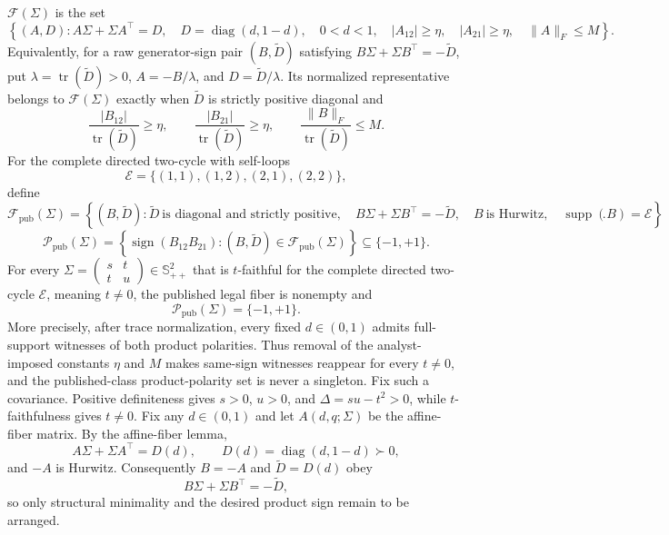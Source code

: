 \(\mathcal F(\Sigma)\) is the set
\[
\left\{(A,D):A\Sigma+\Sigma A^{\top}=D,\quad D=\operatorname{diag}(d,1-d),\quad 0<d<1,\quad |A_{12}|\ge\eta,\quad |A_{21}|\ge\eta,\quad \lVert A\rVert_F\le M\right\}.
\]
Equivalently, for a raw generator-sign pair \((B,\widetilde D)\) satisfying \(B\Sigma+\Sigma B^{\top}=-\widetilde D\), put \(\lambda=\operatorname{tr}(\widetilde D)>0\), \(A=-B/\lambda\), and \(D=\widetilde D/\lambda\). Its normalized representative belongs to \(\mathcal F(\Sigma)\) exactly when \(\widetilde D\) is strictly positive diagonal and
\[
\frac{|B_{12}|}{\operatorname{tr}(\widetilde D)}\ge\eta,\qquad
\frac{|B_{21}|}{\operatorname{tr}(\widetilde D)}\ge\eta,\qquad
\frac{\lVert B\rVert_F}{\operatorname{tr}(\widetilde D)}\le M.
\]
For the complete directed two-cycle with self-loops
\[
\mathcal E=\{(1,1),(1,2),(2,1),(2,2)\},
\]
define
\[
\mathcal F_{\mathrm{pub}}(\Sigma)
=\left\{(B,\widetilde D):
\widetilde D\ \text{is diagonal and strictly positive},\quad
B\Sigma+\Sigma B^{\top}=-\widetilde D,\quad
B\ \text{is Hurwitz},\quad
\operatorname{supp}(B)=\mathcal E
\right\}.
\]
\[
\mathcal P_{\mathrm{pub}}(\Sigma)
=\left\{\operatorname{sign}(B_{12}B_{21}):(B,\widetilde D)\in\mathcal F_{\mathrm{pub}}(\Sigma)\right\}
\subseteq\{-1,+1\}.
\]
For every \(\Sigma=\begin{pmatrix}s&t\\ t&u\end{pmatrix}\in\mathbb S_{++}^{2}\) that is \(t\)-faithful for the complete directed two-cycle \(\mathcal E\), meaning \(t\ne0\), the published legal fiber is nonempty and
\[
\mathcal P_{\mathrm{pub}}(\Sigma)=\{-1,+1\}.
\]
More precisely, after trace normalization, every fixed \(d\in(0,1)\) admits full-support witnesses of both product polarities. Thus removal of the analyst-imposed constants \(\eta\) and \(M\) makes same-sign witnesses reappear for every \(t\ne0\), and the published-class product-polarity set is never a singleton.
Fix such a covariance. Positive definiteness gives \(s>0\), \(u>0\), and \(\Delta=su-t^2>0\), while \(t\)-faithfulness gives \(t\ne0\). Fix any \(d\in(0,1)\) and let \(A(d,q;\Sigma)\) be the affine-fiber matrix. By the affine-fiber lemma,
\[
A\Sigma+\Sigma A^{\top}=D(d),
\qquad D(d)=\operatorname{diag}(d,1-d)\succ0,
\]
and \(-A\) is Hurwitz. Consequently \(B=-A\) and \(\widetilde D=D(d)\) obey
\[
B\Sigma+\Sigma B^{\top}=-\widetilde D,
\]
so only structural minimality and the desired product sign remain to be arranged.

